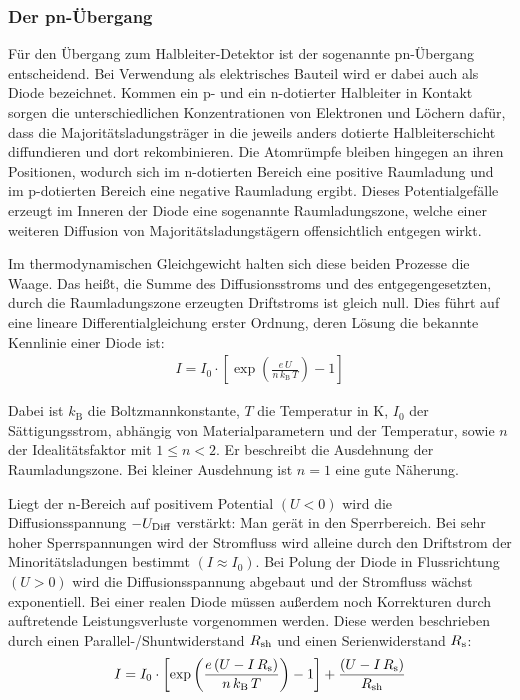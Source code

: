 \subsubsection{Der pn-Übergang}

Für den Übergang zum Halbleiter-Detektor ist der sogenannte pn-Übergang entscheidend.
Bei Verwendung als elektrisches Bauteil wird er dabei auch als Diode bezeichnet.
Kommen ein p- und ein n-dotierter Halbleiter in Kontakt sorgen die unterschiedlichen Konzentrationen von Elektronen und Löchern dafür, dass die Majoritätsladungsträger in die jeweils anders dotierte Halbleiterschicht diffundieren und dort rekombinieren.
Die Atomrümpfe bleiben hingegen an ihren Positionen, wodurch sich im n-dotierten Bereich eine positive Raumladung und im p-dotierten Bereich eine negative Raumladung ergibt.
Dieses Potentialgefälle erzeugt im Inneren der Diode eine sogenannte Raumladungszone, welche einer weiteren Diffusion von Majoritätsladungstägern offensichtlich entgegen wirkt.

Im thermodynamischen Gleichgewicht halten sich diese beiden Prozesse die Waage.
Das heißt, die Summe des Diffusionsstroms und des entgegengesetzten, durch die Raumladungszone erzeugten Driftstroms ist gleich null.
Dies führt auf eine lineare Differentialgleichung erster Ordnung, deren Lösung die bekannte Kennlinie einer Diode ist:
\begin{align}
I=I_0\cdot\left[ \exp\left( \frac{e\,U}{n\,k_\text{B}\,T}\right)  -1\right] 
\end{align} 

\noindent Dabei ist $k_\text{B}$  die Boltzmannkonstante,
$T$ die Temperatur in K, 
$I_0$ der Sättigungsstrom, abhängig von Materialparametern und der Temperatur, sowie
$n$ der Idealitätsfaktor mit $ 1 \leq n < 2$.
Er beschreibt die Ausdehnung der Raumladungszone.
Bei kleiner Ausdehnung ist $n = 1$ eine gute Näherung.

Liegt der n-Bereich auf positivem Potential $(U<0)$ wird die Diffusionsspannung $-U_\textnormal{Diff}$ verstärkt: Man gerät in den Sperrbereich.
Bei sehr hoher Sperrspannungen wird der Stromfluss wird alleine durch den Driftstrom der Minoritätsladungen bestimmt $(I\approx I_0)$.
Bei Polung der Diode in Flussrichtung $(U > 0)$ wird die Diffusionsspannung abgebaut und der Stromfluss wächst exponentiell.
Bei einer realen Diode müssen außerdem noch Korrekturen durch auftretende Leistungsverluste vorgenommen werden.
Diese werden beschrieben durch einen Parallel-/Shuntwiderstand $R_{\textnormal{sh}}$ und einen Serienwiderstand $R_{\textnormal{s}}$:
\begin{align}
I=I_0\cdot\left[ \exp\left( \frac{e\,(U-I\,R_\textnormal{s})}{n\,k_\textnormal{B}\,T}\right)  -1\right] +\frac{(U-I\,R_\textnormal{s})}{R_\textnormal{sh}}
\end{align} 


